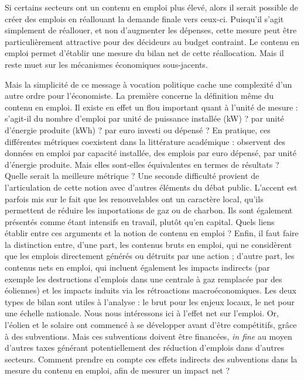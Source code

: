 Si certains secteurs ont un contenu en emploi plus élevé, alors il serait possible de créer des emplois en réallouant la demande finale vers ceux-ci. Puisqu’il s’agit simplement de réallouer, et non d’augmenter les dépenses, cette mesure peut être particulièrement attractive pour des décideurs au budget contraint. Le contenu en emploi permet d'établir une mesure du bilan net de cette réallocation. Mais il reste muet sur les mécanismes économiques sous-jacents. 

Mais la simplicité de ce message à vocation politique cache une complexité d’un autre ordre pour l’économiste. 
La première concerne la définition même du contenu en emploi. Il existe en effet un flou important quant à l’unité de mesure : s’agit-il du nombre d’emploi par unité de puissance installée (kW) ? par unité d’énergie produite (kWh) ? par euro investi ou dépensé ? En pratique, ces différentes métriques coexistent dans la littérature académique : \citet{Cameron2015} observent des données en emploi par capacité installée, \citet{Quirion2013} des emplois par euro dépensé, \citet{Wei2010} par unité d’énergie produite. Mais elles sont-elles équivalentes en termes de résultats ? Quelle serait la meilleure métrique ?
Une seconde difficulté provient de l’articulation de cette notion avec d’autres éléments du débat public. L’accent est parfois mis sur le fait que les renouvelables ont un caractère local, qu’ils permettent de réduire les importations de gaz ou de charbon. Ils sont également présentés comme étant intensifs en travail, plutôt qu’en capital. Quels liens établir entre ces arguments et la notion de contenu en emploi ?
Enfin, il faut faire la distinction entre, d'une part, les contenus bruts en emploi, qui ne considèrent que les emplois directement générés ou détruits par une action ; d'autre part, les contenus nets en emploi, qui incluent également les impacts indirects (par exemple les destructions d'emplois dans une centrale à gaz remplacée par des éoliennes) et les impacts induits via les rétroactions macroéconomiques. 
Les deux types de bilan sont utiles à l'analyse : le brut pour les enjeux locaux, le net pour une échelle nationale. Nous nous intéressons ici à l’effet net sur l’emploi. Or, l'éolien et le solaire ont commencé à se développer avant d’être compétitifs, grâce à des subventions. Mais ces subventions doivent être financées, \textit{in fine} au moyen d’autres taxes générant potentiellement des réduction d’emplois dans d’autres secteurs. Comment prendre en compte ces effets indirects des subventions dans la mesure du contenu en emploi, afin de mesurer un impact net ?

